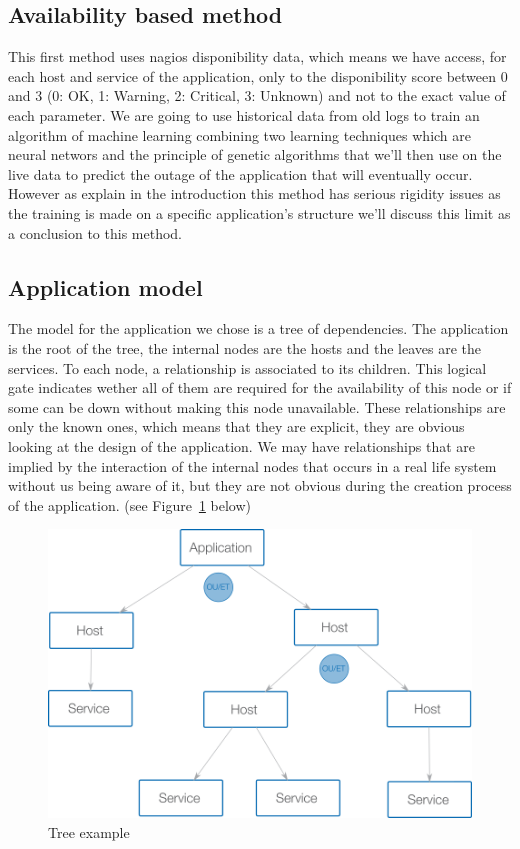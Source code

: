\documentclass[10pt,a4paper,oneside]{article}
\begin{document}
\begin{multicols}{2}
\section{Availability based method}
This first method uses nagios disponibility data, which means we have access, for each host and service of the application, only to the disponibility score between 0 and 3 (0: OK, 1: Warning, 2: Critical, 3: Unknown) and not to the exact value of each parameter. We are going to use historical data from old logs to train an algorithm of machine learning combining two learning techniques which are neural networs and the principle of genetic algorithms that we'll then use on the live data to predict the outage of the application that will eventually occur. However as explain in the introduction this method has serious rigidity issues as the training is made on a specific application's structure we'll discuss this limit as a conclusion to this method.
\subsection{Application model}
The model for the application we chose is a tree of dependencies. The application is the root of the tree, the internal nodes are the hosts and the leaves are the services. To each node, a relationship is associated to its children. This logical gate indicates wether all of them are required for the availability of this node or if some can be down without making this node unavailable. These relationships are only the known ones, which means that they are explicit, they are obvious looking at the design of the application. We may have relationships that are implied by the interaction of the internal nodes that occurs in a real life system without us being aware of it, but they are not obvious during the creation process of the application. (see Figure~\ref{exampletree} below)
\end{multicols}

\vspace{0.8cm}

\begin{figure}
\centering
\includegraphics[scale=0.5]{./images/PNG/abrerelation.png}
\caption{Tree example}
\label{exampletree}
\end{figure}
\end{document}
